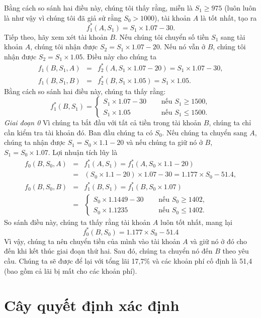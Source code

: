 \documentclass[12pt,a4paper]{report}
\begin{document}
		Bằng cách so sánh hai điều này, chúng tôi thấy rằng, miễn là $S_1 \geq 975$ (luôn luôn là như vậy vì chúng tôi đã giả sử rằng $S_0 > 1000$), tài khoản $A$ là tốt nhất, tạo ra $$f_1^*(A, S_1) = S_1 \times 1.07 - 30.$$ Tiếp theo, hãy xem xét tài khoản $B$. Nếu chúng tôi chuyển số tiền $S_1$ sang tài khoản $A$, chúng tôi nhận được  $S_2 = S_1 \times 1.07 - 20$. Nếu nó vẫn ở $B$, chúng tôi nhận được $S_2 = S_1 \times 1.05$. Điều này cho chúng ta \begin{eqnarray}
			f_1(B, S_1, A) &=& f_2^*(A, S_1 \times 1.07 - 20) = S_1 \times 1.07 - 30, \nonumber \\ f_1(B, S_1, B) &=& f_2^*(B, S_1 \times 1.05) = S_1 \times 1.05. \nonumber
		\end{eqnarray} Bằng cách so sánh hai điều này, chúng ta thấy rằng: $$f_1^*(B, S_1) = \begin{cases}
		S_1\times1.07-30 &\quad \text{ nếu } S_1 \geq 1500,\\ S_1 \times 1.05 &\quad \text{ nếu } S_1 \leq 1500. 
		\end{cases} $$ \textit{Giai đoạn 0} Vì chúng ta bắt đầu với tất cả tiền trong tài khoản $B$, chúng ta chỉ cần kiểm tra tài khoản đó. Ban đầu chúng ta có $S_0$. Nếu chúng ta chuyển sang $A$, chúng ta nhận được $S_1 = S_0 \times 1.1- 20$ và nếu chúng ta giữ nó ở $B$, $S_1 = S_0 \times 1.07$. Lợi nhuận tích lũy là \begin{eqnarray}
			f_0(B, S_0, A) &=& f_1^*(A, S_1) = f_1^*(A, S_0\times1.1-20) \nonumber\\&=&(S_0 \times 1.1 - 20) \times 1.07 - 30 = 1.177 \times S_0 - 51.4, \nonumber\\f_0(B,S_0,B) &=& f_1^*(B, S_1)=f_1^*(B,S_0\times1.07) \nonumber \\&=& \begin{cases}
			S_0 \times 1.1449 - 30 & \quad \text{ nếu } S_0 \geq 1402,\\S_0 \times 1.1235 & \quad \text{ nếu } S_0 \leq 1402.
			\end{cases}\nonumber
		\end{eqnarray} So sánh điều này, chúng ta thấy rằng tài khoản $A$ luôn tốt nhất, mang lại $$f_0^*(B, S_0) = 1.177\times S_0 - 51.4$$ Vì vậy, chúng ta nên chuyển tiền của mình vào tài khoản $A$ và giữ nó ở đó cho đến khi kết thúc giai đoạn thứ hai. Sau đó, chúng ta chuyển nó đến $B$ theo yêu cầu. Chúng ta sẽ được để lại với tổng lãi 17,7\% và các khoản phí cố định là 51,4 (bao gồm cả lãi bị mất cho các khoản phí). 
	\section{Cây quyết định xác định}
	
\end{document}
